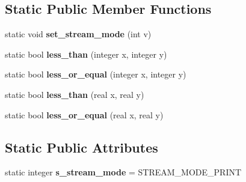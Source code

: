 \subsection*{Static Public Member Functions}
\begin{DoxyCompactItemize}
\item 
\mbox{\label{classez_1_1objects_1_1Object_ad46b641b37e6d6afe53c5418928efa43}} 
static void {\bfseries set\+\_\+stream\+\_\+mode} (int v)
\item 
\mbox{\label{classez_1_1objects_1_1Object_a3a0d4e2047030ad125a003580d06f713}} 
static bool {\bfseries less\+\_\+than} (integer x, integer y)
\item 
\mbox{\label{classez_1_1objects_1_1Object_a196622c6e9045be7350c4bac24e0370d}} 
static bool {\bfseries less\+\_\+or\+\_\+equal} (integer x, integer y)
\item 
\mbox{\label{classez_1_1objects_1_1Object_a958cbe4573178f12839341fb6ad82a32}} 
static bool {\bfseries less\+\_\+than} (real x, real y)
\item 
\mbox{\label{classez_1_1objects_1_1Object_ae9306463489907e41b94a680bf6ded86}} 
static bool {\bfseries less\+\_\+or\+\_\+equal} (real x, real y)
\end{DoxyCompactItemize}
\subsection*{Static Public Attributes}
\begin{DoxyCompactItemize}
\item 
\mbox{\label{classez_1_1objects_1_1Object_adca3452be383704327f1ff86d95797ad}} 
static integer {\bfseries s\+\_\+stream\+\_\+mode} = S\+T\+R\+E\+A\+M\+\_\+\+M\+O\+D\+E\+\_\+\+P\+R\+I\+NT
\end{DoxyCompactItemize}
